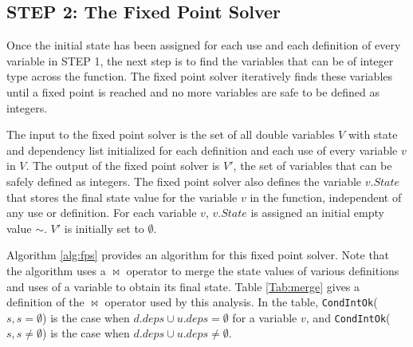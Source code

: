 \subsection{STEP 2: The Fixed Point Solver}

Once the initial state has been assigned for each use and each definition of
every variable in STEP 1, the next step is to find the variables that can be
of integer type across the function. The fixed point solver iteratively finds
these variables until a fixed point is reached and no more variables are safe
to be defined as integers.

The input to the fixed point solver is the set of all double variables $V$ with
state and dependency list initialized for each definition and each use of every
variable $v$ in $V$.
The output of the fixed point solver is $V'$, the set of variables that
can be safely defined as integers. The fixed point solver also defines the variable
$v.State$ that stores the final state value for the variable $v$ in the
function, independent of any use or definition. For each variable $v$,
$v.State$ is assigned an initial empty value $\sim$. $V'$ is initially
set to $\emptyset$.

Algorithm \ref{alg:fps} provides an algorithm for this fixed point solver.
Note that the algorithm uses a $\bowtie$ operator to merge the state values of
various definitions and uses of a variable to obtain its final state. Table
\ref{Tab:merge} gives a definition of the $\bowtie$ operator used by this
analysis. In the table, \texttt{CondIntOk}($s,s=\emptyset$) is the case when
$d.deps \cup u.deps = \emptyset$ for a variable $v$, and
\texttt{CondIntOk}($s,s\ne\emptyset$) 
is the case when $d.deps \cup u.deps \ne \emptyset$.
\begin{table}[b]
\centering
\footnotesize{
}
\caption{Definition of the $\bowtie$ merge operator}
\label{Tab:merge}
\end{table}

